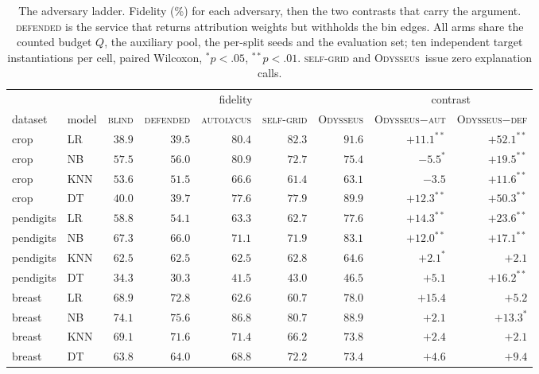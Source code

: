 \documentclass[sigconf,anonymous,review]{acmart}
\newcommand{\sys}{\textsc{Odysseus}}
\begin{document}
\begin{table}[t]
\centering
\caption{The adversary ladder. Fidelity (\%) for each adversary, then the two contrasts that carry
the argument. \textsc{defended} is the service that returns attribution weights but withholds the bin
edges. All arms share the counted budget $Q$, the auxiliary pool, the per-split seeds and the
evaluation set; ten independent target instantiations per cell, paired Wilcoxon, $^{*}p{<}.05$,
$^{**}p{<}.01$. \textsc{self-grid} and \sys\ issue zero explanation calls.}
\label{tab:ladder}
\begin{tabular}{llrrrrrrr}
\toprule
& & \multicolumn{5}{c}{fidelity} & \multicolumn{2}{c}{contrast} \\
\cmidrule(lr){3-7}\cmidrule(lr){8-9}
dataset & model & \textsc{blind} & \textsc{defended} & \textsc{autolycus} & \textsc{self-grid}
& \sys & \sys$-$\textsc{aut} & \sys$-$\textsc{def} \\
\midrule
crop       & LR   & $38.9$ & $39.5$ & $80.4$ & $82.3$ & $91.6$ & $+11.1^{**}$ & $+52.1^{**}$ \\
crop       & NB   & $57.5$ & $56.0$ & $80.9$ & $72.7$ & $75.4$ & $-5.5^{*}$ & $+19.5^{**}$ \\
crop       & KNN  & $53.6$ & $51.5$ & $66.6$ & $61.4$ & $63.1$ & $-3.5$ & $+11.6^{**}$ \\
crop       & DT   & $40.0$ & $39.7$ & $77.6$ & $77.9$ & $89.9$ & $+12.3^{**}$ & $+50.3^{**}$ \\
\addlinespace
pendigits  & LR   & $58.8$ & $54.1$ & $63.3$ & $62.7$ & $77.6$ & $+14.3^{**}$ & $+23.6^{**}$ \\
pendigits  & NB   & $67.3$ & $66.0$ & $71.1$ & $71.9$ & $83.1$ & $+12.0^{**}$ & $+17.1^{**}$ \\
pendigits  & KNN  & $62.5$ & $62.5$ & $62.5$ & $62.8$ & $64.6$ & $+2.1^{*}$ & $+2.1$ \\
pendigits  & DT   & $34.3$ & $30.3$ & $41.5$ & $43.0$ & $46.5$ & $+5.1$ & $+16.2^{**}$ \\
\addlinespace
breast     & LR   & $68.9$ & $72.8$ & $62.6$ & $60.7$ & $78.0$ & $+15.4$ & $+5.2$ \\
breast     & NB   & $74.1$ & $75.6$ & $86.8$ & $80.7$ & $88.9$ & $+2.1$ & $+13.3^{*}$ \\
breast     & KNN  & $69.1$ & $71.6$ & $71.4$ & $66.2$ & $73.8$ & $+2.4$ & $+2.1$ \\
breast     & DT   & $63.8$ & $64.0$ & $68.8$ & $72.2$ & $73.4$ & $+4.6$ & $+9.4$ \\

\end{tabular}
\end{table}
\end{document}
